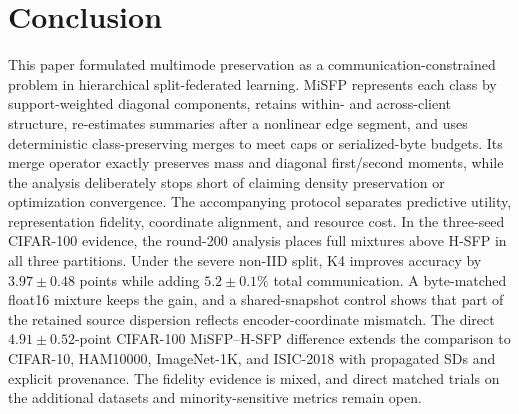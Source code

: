 \section{Conclusion}\label{sec:conclusion}
This paper formulated multimode preservation as a communication-constrained problem in hierarchical split-federated learning. MiSFP represents each class by support-weighted diagonal components, retains within- and across-client structure, re-estimates summaries after a nonlinear edge segment, and uses deterministic class-preserving merges to meet caps or serialized-byte budgets. Its merge operator exactly preserves mass and diagonal first/second moments, while the analysis deliberately stops short of claiming density preservation or optimization convergence. The accompanying protocol separates predictive utility, representation fidelity, coordinate alignment, and resource cost. In the three-seed CIFAR-100 evidence, the round-200 analysis places full mixtures above H-SFP in all three partitions. Under the severe non-IID split, K4 improves accuracy by $3.97\pm0.48$ points while adding $5.2\pm0.1\%$ total communication. A byte-matched float16 mixture keeps the gain, and a shared-snapshot control shows that part of the retained source dispersion reflects encoder-coordinate mismatch. The direct $4.91\pm0.52$-point CIFAR-100 MiSFP--H-SFP difference extends the comparison to CIFAR-10, HAM10000, ImageNet-1K, and ISIC-2018 with propagated SDs and explicit provenance. The fidelity evidence is mixed, and direct matched trials on the additional datasets and minority-sensitive metrics remain open.
